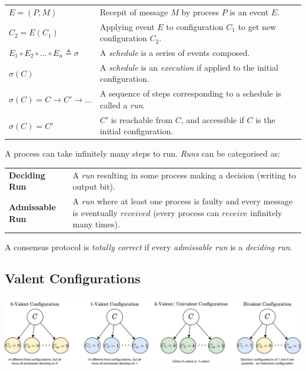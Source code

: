 \begin{center}
    \begin{tabular}{l p{}}
        $E = (P,M)$ & Recepit of message $M$ by process $P$ is an event $E$. \\
        $C_2 = E(C_1)$ & Applying event $E$ to configuration $C_1$ to get new configuration $C_2$. \\
        $E_1 \circ E_2 \circ \dots \circ E_n \triangleq \sigma$ & A \textit{schedule} is a series of events composed. \\
        $\sigma (C)$ & A \textit{schedule} is an \textit{execution} if applied to the initial configuration. \\
        $\sigma(C) = C \to C' \to \dots$ & A sequence of steps corresponding to a schedule is called a \textit{run}. \\
        $\sigma(C) = C'$ & $C'$ is reachable from $C$, and accessible if $C$ is the initial configuration. \\
    \end{tabular}
\end{center}
A process can take infinitely many steps to run. \textit{Runs} can be categorised as:
\begin{center}
    \begin{tabular}{l p{}}
        \textbf{Deciding Run} & A \textit{run} resulting in some process making a decision (writing to output bit). \\
        \textbf{Admissable Run} & A \textit{run} where at least one process is faulty and every message is eventually $received$ (every process can $receive$ infinitely many times). \\
    \end{tabular}
\end{center}
A consensus protocol is \textit{totally correct} if every \textit{admissable run} is a \textit{deciding run}. 

\subsection{Valent Configurations}
\begin{center}
    \includegraphics[width=\textwidth]{consensus/images/valent_configurations.drawio.png}
\end{center}

